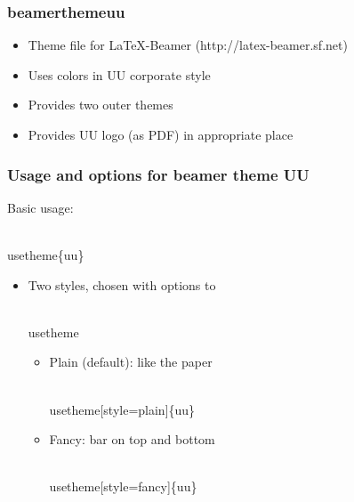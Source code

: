 \begin{frame}
\frametitle{beamerthemeuu}
\begin{itemize}
\item Theme file for {\LaTeX}-Beamer (http://latex-beamer.sf.net)
\item Uses colors in UU corporate style
\item Provides two outer themes
\item Provides UU logo (as PDF) in appropriate place
\end{itemize}
\end{frame}

\begin{frame}
\frametitle{Usage and options for beamer theme UU}
Basic usage: \begin{semiverbatim}\\usetheme\{uu\}\end{semiverbatim}
\begin{itemize}
\item Two styles, chosen with options to \begin{semiverbatim}\\usetheme\end{semiverbatim}
    \begin{itemize}
    \item Plain (default): like the paper \begin{semiverbatim}\\usetheme[style=plain]\{uu\}\end{semiverbatim}
    \item Fancy: bar on top and bottom  \begin{semiverbatim}\\usetheme[style=fancy]\{uu\}\end{semiverbatim}
    \end{itemize}
\end{itemize}
\end{frame}


